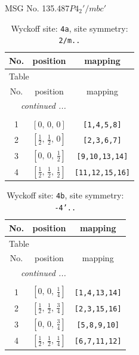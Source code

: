 \documentclass[fleqn,8pt]{jsarticle}
\begin{document}
\setcounter{MaxMatrixCols}{32}

\renewcommand{\tablename}{Table~}
\renewcommand{\figurename}{Figure~}
\begin{center}
\LARGE
MSG No. 135.487\quad$P4_{2}'/mbc'$
\end{center}
\renewcommand{\arraystretch}{1.2}
\begin{longtable}{ccc}
\caption{Wyckoff site: {\tt 4a}, site symmetry: {\tt 2/m..}}
 \\
 \hline \hline
No. & position & mapping \\ \hline \endfirsthead

\multicolumn{2}{l}{\tablename\ \thetable{}} \\
 \hline \hline
No. & position & mapping \\ \hline \endhead

 \hline \hline
\multicolumn{2}{r}{\footnotesize\it continued ...} \\ \endfoot

 \hline \hline
\multicolumn{2}{r}{} \\ \endlastfoot

1 & $\left[ 0,\, 0,\, 0 \right]$ & {\tt [1,4,5,8]} \\ \hline
2 & $\left[ \frac{1}{2},\, \frac{1}{2},\, 0 \right]$ & {\tt [2,3,6,7]} \\ \hline
3 & $\left[ 0,\, 0,\, \frac{1}{2} \right]$ & {\tt [9,10,13,14]} \\ \hline
4 & $\left[ \frac{1}{2},\, \frac{1}{2},\, \frac{1}{2} \right]$ & {\tt [11,12,15,16]} \\
\end{longtable}
\renewcommand{\arraystretch}{1.2}
\begin{longtable}{ccc}
\caption{Wyckoff site: {\tt 4b}, site symmetry: {\tt -4'..}}
 \\
 \hline \hline
No. & position & mapping \\ \hline \endfirsthead

\multicolumn{2}{l}{\tablename\ \thetable{}} \\
 \hline \hline
No. & position & mapping \\ \hline \endhead

 \hline \hline
\multicolumn{2}{r}{\footnotesize\it continued ...} \\ \endfoot

 \hline \hline
\multicolumn{2}{r}{} \\ \endlastfoot

1 & $\left[ 0,\, 0,\, \frac{1}{4} \right]$ & {\tt [1,4,13,14]} \\ \hline
2 & $\left[ \frac{1}{2},\, \frac{1}{2},\, \frac{3}{4} \right]$ & {\tt [2,3,15,16]} \\ \hline
3 & $\left[ 0,\, 0,\, \frac{3}{4} \right]$ & {\tt [5,8,9,10]} \\ \hline
4 & $\left[ \frac{1}{2},\, \frac{1}{2},\, \frac{1}{4} \right]$ & {\tt [6,7,11,12]} \\
\end{longtable}
\end{document}

